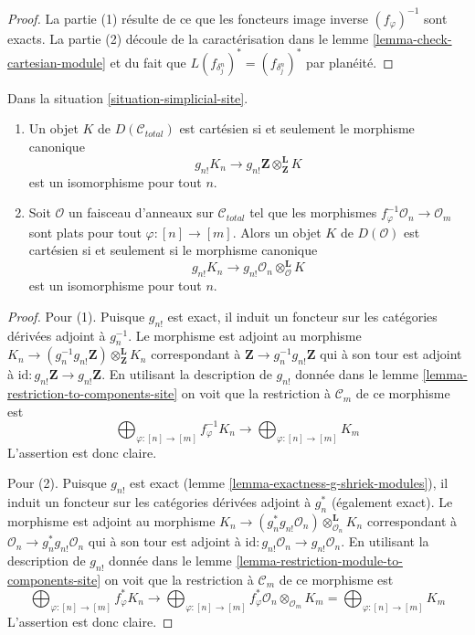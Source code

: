 \begin{proof}
La partie (1) résulte de ce que les foncteurs image inverse $(f_\varphi)^{-1}$
sont exacts. La partie (2) découle de la caractérisation dans le lemme
\ref{lemma-check-cartesian-module}
et du fait que $L(f_{\delta^n_j})^* = (f_{\delta^n_j})^*$
par planéité.
\end{proof}

\begin{lemma}
\label{lemma-derived-cartesian-shriek}
Dans la situation \ref{situation-simplicial-site}.
\begin{enumerate}
\item Un objet $K$ de $D(\mathcal{C}_{total})$ est cartésien si et seulement
le morphisme canonique
$$
g_{n!}K_n \longrightarrow
g_{n!}\mathbf{Z} \otimes^\mathbf{L}_\mathbf{Z} K
$$
est un isomorphisme pour tout $n$.
\item Soit $\mathcal{O}$ un faisceau d'anneaux sur $\mathcal{C}_{total}$
tel que les morphismes $f_\varphi^{-1}\mathcal{O}_n \to \mathcal{O}_m$
sont plats pour tout $\varphi : [n] \to [m]$. Alors un objet $K$ de
$D(\mathcal{O})$ est cartésien si et seulement si le morphisme canonique
$$
g_{n!}K_n \longrightarrow
g_{n!}\mathcal{O}_n \otimes^\mathbf{L}_\mathcal{O} K
$$
est un isomorphisme pour tout $n$.
\end{enumerate}
\end{lemma}

\begin{proof}
Pour (1). Puisque $g_{n!}$ est exact, il induit un foncteur
sur les catégories dérivées adjoint à $g_n^{-1}$.
Le morphisme est adjoint au morphisme
$K_n \to (g_n^{-1}g_{n!}\mathbf{Z}) \otimes^\mathbf{L}_\mathbf{Z} K_n$
correspondant à $\mathbf{Z} \to g_n^{-1}g_{n!}\mathbf{Z}$
qui à son tour est adjoint à
$\text{id} : g_{n!}\mathbf{Z} \to g_{n!}\mathbf{Z}$.
En utilisant la description de $g_{n!}$
donnée dans le lemme \ref{lemma-restriction-to-components-site}
on voit que la restriction à $\mathcal{C}_m$ de ce morphisme
est
$$
\bigoplus\nolimits_{\varphi : [n] \to [m]} f_\varphi^{-1}K_n
\longrightarrow
\bigoplus\nolimits_{\varphi : [n] \to [m]} K_m
$$
L'assertion est donc claire.

\medskip\noindent
Pour (2). Puisque $g_{n!}$ est exact
(lemme \ref{lemma-exactness-g-shriek-modules}), il induit un foncteur
sur les catégories dérivées adjoint à $g_n^*$ (également exact).
Le morphisme est adjoint au morphisme
$K_n \to (g_n^*g_{n!}\mathcal{O}_n) \otimes^\mathbf{L}_{\mathcal{O}_n} K_n$
correspondant à $\mathcal{O}_n \to g_n^*g_{n!}\mathcal{O}_n$
qui à son tour est adjoint à
$\text{id} : g_{n!}\mathcal{O}_n \to g_{n!}\mathcal{O}_n$.
En utilisant la description de $g_{n!}$
donnée dans le lemme \ref{lemma-restriction-module-to-components-site}
on voit que la restriction à $\mathcal{C}_m$ de ce morphisme
est
$$
\bigoplus\nolimits_{\varphi : [n] \to [m]} f_\varphi^*K_n
\longrightarrow
\bigoplus\nolimits_{\varphi : [n] \to [m]}
f_\varphi^*\mathcal{O}_n \otimes_{\mathcal{O}_m} K_m =
\bigoplus\nolimits_{\varphi : [n] \to [m]} K_m
$$
L'assertion est donc claire.
\end{proof}

